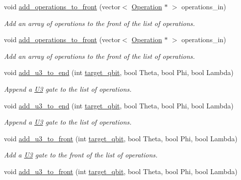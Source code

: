 \begin{DoxyCompactItemize}
void \hyperlink{class_operation__block_a50210aa57a18243de26631e0f6f823b6}{add\+\_\+operations\+\_\+to\+\_\+front} (vector$<$ \hyperlink{class_operation}{Operation} $\ast$ $>$ operations\+\_\+in)
\begin{DoxyCompactList}\small\item\em Add an array of operations to the front of the list of operations. \end{DoxyCompactList}\item 
void \hyperlink{class_operation__block_a50210aa57a18243de26631e0f6f823b6}{add\+\_\+operations\+\_\+to\+\_\+front} (vector$<$ \hyperlink{class_operation}{Operation} $\ast$ $>$ operations\+\_\+in)
\begin{DoxyCompactList}\small\item\em Add an array of operations to the front of the list of operations. \end{DoxyCompactList}\item 
void \hyperlink{class_operation__block_a44940209dbc5754b676b5a493bb153f4}{add\+\_\+u3\+\_\+to\+\_\+end} (int \hyperlink{class_operation_a3e489b72c124b494777c71b1646bb1e9}{target\+\_\+qbit}, bool Theta, bool Phi, bool Lambda)
\begin{DoxyCompactList}\small\item\em Append a \hyperlink{class_u3}{U3} gate to the list of operations. \end{DoxyCompactList}\item 
void \hyperlink{class_operation__block_a44940209dbc5754b676b5a493bb153f4}{add\+\_\+u3\+\_\+to\+\_\+end} (int \hyperlink{class_operation_a3e489b72c124b494777c71b1646bb1e9}{target\+\_\+qbit}, bool Theta, bool Phi, bool Lambda)
\begin{DoxyCompactList}\small\item\em Append a \hyperlink{class_u3}{U3} gate to the list of operations. \end{DoxyCompactList}\item 
void \hyperlink{class_operation__block_ac870a2afab73fa33f706e2e35829b452}{add\+\_\+u3\+\_\+to\+\_\+front} (int \hyperlink{class_operation_a3e489b72c124b494777c71b1646bb1e9}{target\+\_\+qbit}, bool Theta, bool Phi, bool Lambda)
\begin{DoxyCompactList}\small\item\em Add a \hyperlink{class_u3}{U3} gate to the front of the list of operations. \end{DoxyCompactList}\item 
void \hyperlink{class_operation__block_ac870a2afab73fa33f706e2e35829b452}{add\+\_\+u3\+\_\+to\+\_\+front} (int \hyperlink{class_operation_a3e489b72c124b494777c71b1646bb1e9}{target\+\_\+qbit}, bool Theta, bool Phi, bool Lambda)

\end{DoxyCompactItemize}
